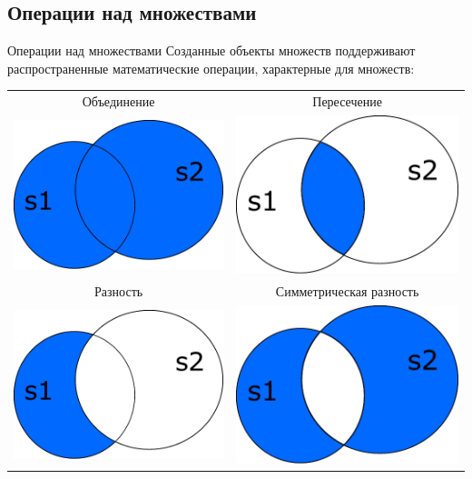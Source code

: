 \documentclass[aspectratio=169, mathserif]{beamer}%
\begin{document}
\subsection{Операции над множествами}
\begin{frame}[fragile]{Операции над множествами}
\scriptsize
Созданные объекты множеств поддерживают распространенные математические операции, характерные для множеств:

\centering
\begin{tabular}{cc}
	Объединение & Пересечение \\
	\includegraphics[width=.27\textwidth]{pics/union} &
	\includegraphics[width=.27\textwidth]{pics/intersection} \\
	Разность & Симметрическая разность \\
	\includegraphics[width=.27\textwidth]{pics/difference} &
	\includegraphics[width=.27\textwidth]{pics/simmetric_difference} \\
\end{tabular}
\vfill
\end{frame}
\end{document}
